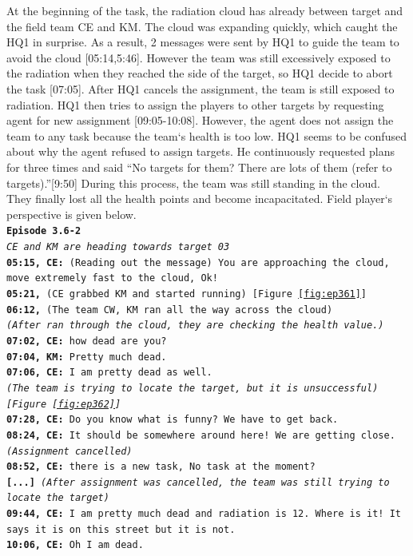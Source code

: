 At the beginning of the task, the radiation cloud has already between target and the field team CE and KM. The cloud was expanding quickly, which caught the HQ1 in surprise. As a result, 2 messages were sent by HQ1 to guide the team to avoid the cloud [05:14,5:46]. However the team was still excessively exposed to the radiation when they reached the side of the target, so HQ1 decide to abort the task [07:05]. After HQ1 cancels the assignment, the team is still exposed to radiation. HQ1 then tries to assign the players to other targets by requesting agent for new assignment [09:05-10:08]. However, the agent does not assign the team to any task because the team`s health is too low. HQ1 seems to be confused about why the agent refused to assign targets. He continuously requested plans for three times and said ``No targets for them? There are lots of them (refer to targets).''[9:50] During this process, the team was still standing in the cloud. They finally lost all the health points and become incapacitated. Field player`s perspective is given below. \\


\noindent\texttt{\textbf{Episode 3.6-2 }\\
\emph{CE and KM are heading towards target 03}\\
\textbf{05:15, CE: } (Reading out the message) You are approaching the cloud, move extremely fast to the cloud, Ok! \\
\textbf{05:21,} (CE grabbed KM and started running) [Figure \ref{fig:ep361}]\\
\textbf{06:12,} (The team CW, KM ran all the way across the cloud) \\
\emph{(After ran through the cloud, they are checking the health value.)}\\
\textbf{07:02, CE: } how dead are you?\\
\textbf{07:04, KM: } Pretty much dead.\\
\textbf{07:06, CE: } I am pretty dead as well.\\
\emph{(The team is trying to locate the target, but it is unsuccessful) [Figure \ref{fig:ep362}]}\\
\textbf{07:28, CE: } Do you know what is funny? We have to get back.\\
\textbf{08:24, CE: } It should be somewhere around here! We are getting close.\\
\emph{(Assignment cancelled)}\\
\textbf{08:52, CE: } there is a new task, No task at the moment? \\
\textbf{[...]} 
\emph{(After assignment was cancelled, the team was still trying to locate the target)}\\
\textbf{09:44, CE: } I am pretty much dead and radiation is 12. Where is it! It says it is on this street but it is not. \\
\textbf{10:06, CE: } Oh I am dead.\\
}

